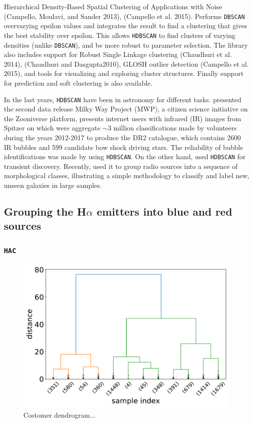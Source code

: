 \documentclass[fleqn,usenatbib]{mnras}
\begin{document}
Hierarchical Density-Based Spatial Clustering of Applications with Noise (Campello,
Moulavi, and Sander 2013), (Campello et al. 2015). Performs \texttt{DBSCAN} overvarying
epsilon values and integrates the result to find a clustering that gives the best
stability over epsilon. This allows \texttt{HDBSCAN} to find clusters of varying densities
(unlike \texttt{DBSCAN}), and be more robust to parameter selection. The library also
includes support for Robust Single Linkage clustering (Chaudhuri et al. 2014),
(Chaudhuri and Dasgupta2010), GLOSH outlier detection (Campello et al. 2015), and
tools for visualizing and exploring cluster structures. Finally support for prediction
and soft clustering is also available.

In the last years, \texttt{HDBSCAN} have been in astronomy for different tasks.
\citet{Jayasinghe:2019} presented the second data release Milky Way Project (MWP), a citizen
science initiative on the Zooniverse platform, presents internet users with infrared (IR)
images from Spitzer on which were aggregate $\sim$3 million classifications made
by volunteers during the years 2012-2017 to produce the DR2 catalogue, which
contains 2600 IR bubbles and 599 candidate bow shock driving stars.
The reliability of bubble identifications was made by using \texttt{HDBSCAN}.
On the other hand, \citet{Webb:2020} used \texttt{HDBSCAN} for transient discovery.
Recently, \citet{Ntwaetsile:2021} used it to group radio sources into a sequence
of morphological classes, illustrating a simple methodology to classify and
label new, unseen galaxies in large samples. 

\subsection{Grouping the H{$\alpha$} emitters into blue and red sources}
\label{sec:apply-hac-hdbscan}

\subsubsection{\texttt{HAC}}

\begin{figure}
	\includegraphics[width=0.9\linewidth]{Figs/Customer-Dendrograms.pdf}
    \caption{Costomer dendrogram...}
    \label{fig:dendrogram}
\end{figure}
\end{document}
